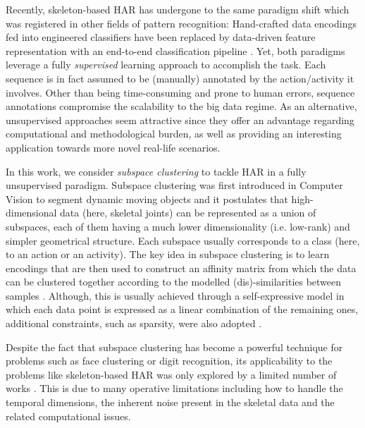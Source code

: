 \documentclass[10pt,a4paper,conference]{IEEEtran}
\begin{document}
Recently, skeleton-based HAR has undergone to the same paradigm shift which was registered in other fields of pattern recognition: Hand-crafted data encodings fed into engineered classifiers have been replaced by data-driven feature representation with an end-to-end classification pipeline \cite{NIPS2012_4824}. Yet, both paradigms leverage a fully \emph{supervised} learning approach to accomplish the task. Each sequence is in fact assumed to be (manually) annotated by the action/activity it involves. Other than being time-consuming and prone to human errors, sequence annotations compromise the scalability to the big data regime. As an alternative, unsupervised approaches seem attractive since they offer an advantage regarding computational and methodological burden, as well as providing an interesting application towards more novel real-life scenarios. 

In this work, we consider \emph{subspace clustering} to tackle HAR in a fully unsupervised paradigm. Subspace clustering was first introduced in Computer Vision to segment dynamic moving objects \cite{gear1998multibody,costeira1998multibody} and it postulates that high-dimensional data (here, skeletal joints) can be represented as a union of subspaces, each of them having a much lower dimensionality (i.e. low-rank) and simpler geometrical structure. Each subspace usually corresponds to a class (here, to an action or an activity). The key idea in subspace clustering is to learn encodings that are then used to construct an affinity matrix from which the data can be clustered together according to the modelled (dis)-similarities between samples \cite{vidal2011subspace}. Although, this is usually achieved through a self-expressive model in which each data point is expressed as a linear combination of the remaining ones, additional constraints, such as sparsity, were also adopted \cite{elhamifar2013sparse}.


Despite the fact that subspace clustering has become a powerful technique for problems such as face clustering or digit recognition, its applicability to the problems like skeleton-based HAR was only explored by a limited number of works \cite{zhang2012improving,li2015temporal,clopton2017temporal}. This is due to many operative limitations including how to handle the temporal dimensions, the inherent noise present in the skeletal data and the related computational issues. 
\end{document}
